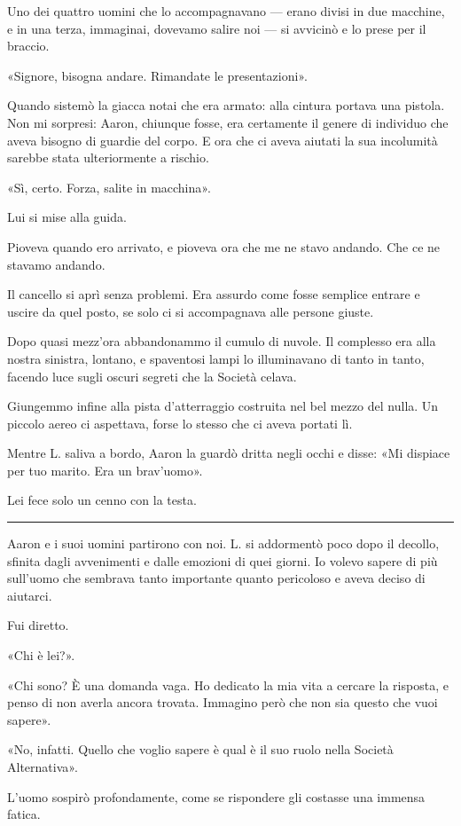 Uno dei quattro uomini che lo accompagnavano --- erano divisi in due macchine, e in una terza,
immaginai, dovevamo salire noi --- si avvicinò e lo prese per il braccio.

«Signore, bisogna andare. Rimandate le presentazioni».

Quando sistemò la giacca notai che era armato: alla cintura portava una pistola. Non mi sorpresi:
Aaron, chiunque fosse, era certamente il genere di individuo che aveva bisogno di guardie del corpo.
E ora che ci aveva aiutati la sua incolumità sarebbe stata ulteriormente a rischio.

«Sì, certo. Forza, salite in macchina».

Lui si mise alla guida.

Pioveva quando ero arrivato, e pioveva ora che me ne stavo andando. Che ce ne stavamo andando.

Il cancello si aprì senza problemi. Era assurdo come fosse semplice entrare e uscire da quel posto,
se solo ci si accompagnava alle persone giuste.

Dopo quasi mezz'ora abbandonammo il cumulo di nuvole. Il complesso era alla nostra sinistra,
lontano, e spaventosi lampi lo illuminavano di tanto in tanto, facendo luce sugli oscuri segreti che
la Società celava.

Giungemmo infine alla pista d'atterraggio costruita nel bel mezzo del nulla. Un piccolo aereo ci
aspettava, forse lo stesso che ci aveva portati lì.

Mentre L. saliva a bordo, Aaron la guardò dritta negli occhi e disse: «Mi dispiace per tuo marito.
Era un brav'uomo».

Lei fece solo un cenno con la testa.

\plainbreak{1}

Aaron e i suoi uomini partirono con noi. L. si addormentò poco dopo il decollo, sfinita dagli
avvenimenti e dalle emozioni di quei giorni. Io volevo sapere di più sull'uomo che sembrava tanto
importante quanto pericoloso e aveva deciso di aiutarci.

Fui diretto.

«Chi è lei?».

«Chi sono? È una domanda vaga. Ho dedicato la mia vita a cercare la risposta, e penso di non averla
ancora trovata. Immagino però che non sia questo che vuoi sapere».

«No, infatti. Quello che voglio sapere è qual è il suo ruolo nella Società Alternativa».

L'uomo sospirò profondamente, come se rispondere gli costasse una immensa fatica.

